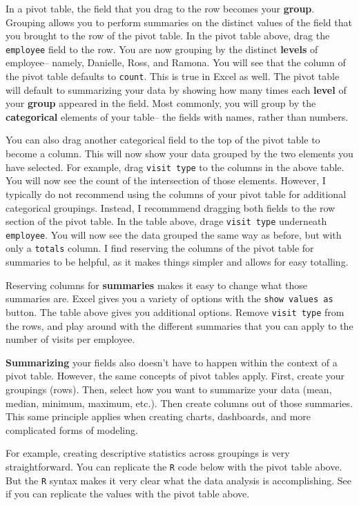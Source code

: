 \documentclass[]{book}
\begin{document}
In a pivot table, the field that you drag to the row becomes your \textbf{group}. Grouping allows you to perform summaries on the distinct values of the field that you brought to the row of the pivot table. In the pivot table above, drag the \texttt{employee} field to the row. You are now grouping by the distinct \textbf{levels} of employee-- namely, Danielle, Ross, and Ramona. You will see that the column of the pivot table defaults to \texttt{count}. This is true in Excel as well. The pivot table will default to summarizing your data by showing how many times each \textbf{level} of your \textbf{group} appeared in the field. Most commonly, you will group by the \textbf{categorical} elements of your table-- the fields with names, rather than numbers.

You can also drag another categorical field to the top of the pivot table to become a column. This will now show your data grouped by the two elements you have selected. For example, drag \texttt{visit\ type} to the columns in the above table. You will now see the count of the intersection of those elements. However, I typically do not recommend using the columns of your pivot table for additional categorical groupings. Instead, I recommmend dragging both fields to the row section of the pivot table. In the table above, drage \texttt{visit\ type} underneath \texttt{employee}. You will now see the data grouped the same way as before, but with only a \texttt{totals} column. I find reserving the columns of the pivot table for summaries to be helpful, as it makes things simpler and allows for easy totalling.

Reserving columns for \textbf{summaries} makes it easy to change what those summaries are. Excel gives you a variety of options with the \texttt{show\ values\ as} button. The table above gives you additional options. Remove \texttt{visit\ type} from the rows, and play around with the different summaries that you can apply to the number of visits per employee.

\textbf{Summarizing} your fields also doesn't have to happen within the context of a pivot table. However, the same concepts of pivot tables apply. First, create your groupings (rows). Then, select how you want to summarize your data (mean, median, minimum, maximum, etc.). Then create columns out of those summaries. This same principle applies when creating charts, dashboards, and more complicated forms of modeling.

For example, creating descriptive statistics across groupings is very straightforward. You can replicate the \texttt{R} code below with the pivot table above. But the \texttt{R} syntax makes it very clear what the data analysis is accomplishing. See if you can replicate the values with the pivot table above.
\end{document}
